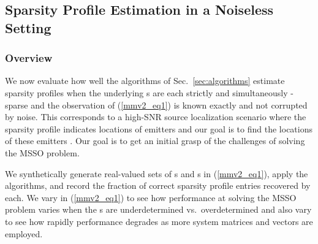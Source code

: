 \documentclass[final]{siamltex}
\begin{document}
\subsection{Sparsity Profile Estimation in a Noiseless Setting}
\label{subsec:e1}

   \subsubsection{Overview} We now evaluate how well the algorithms of
   Sec.~\ref{sec:algorithms} estimate sparsity profiles when the
   underlying s are each strictly and simultaneously
   -sparse and the observation  of (\ref{mmv2_eq1}) is
   known exactly and not corrupted by noise.  This corresponds to a
   high-SNR source localization scenario where the sparsity profile
   indicates locations of emitters and our goal is to find the
   locations of these emitters \cite{Joh1993, Kri1996, Mal2003,
   Mal2005}.  Our goal is to get an initial grasp of the challenges of
   solving the MSSO problem.

   We synthetically generate real-valued sets of s and
   s in (\ref{mmv2_eq1}), apply the algorithms, and record
   the fraction of correct sparsity profile entries recovered by each.
   We vary  in (\ref{mmv2_eq1}) to see how performance at solving
   the MSSO problem varies when the s are underdetermined
   vs.~overdetermined and also vary  to see how rapidly performance
   degrades as more system matrices and vectors are employed.
\end{document}
